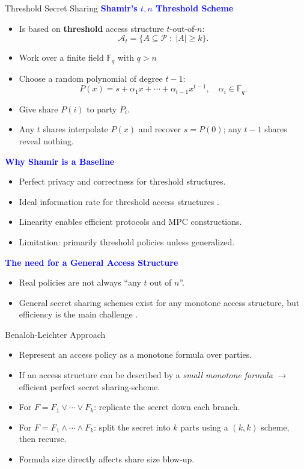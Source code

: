 \begin{frame}[allowframebreaks]{Threshold Secret Sharing}
	\textbf{\textcolor{blue}{Shamir's \(t, n\) Threshold Scheme}}
	\begin{itemize}
		\item Is based on \textbf{threshold} access structure \(t\)-out-of-\(n\):
			\[
			\mathcal{A}_t = \{A\subseteq \mathcal{P}\;:\;|A|\ge k\}.
			\]
		\item Work over a finite field \(\mathbb{F}_q\) with \(q>n\)
		\item Choose a random polynomial of degree \(t-1\):
		\[
		P(x) = s + \alpha_1x + \cdots + \alpha_{t-1}x^{t-1},
		\quad \alpha_i \in \mathbb{F}_q.
		\]
		\item Give share \(P(i)\) to party \(P_i\).
		\item Any \(t\) shares interpolate \(P(x)\) and recover \(s=P(0)\); any \(t-1\) shares reveal nothing.
	\end{itemize}
	
	\textbf{\textcolor{blue}{Why Shamir is a Baseline}}
	\begin{itemize}
		\item Perfect privacy and correctness for threshold structures.
		\item Ideal information rate for threshold access structures \cite{brickell1989some}.
		\item Linearity enables efficient protocols and MPC constructions.
		\item Limitation: primarily threshold policies unless generalized.
	\end{itemize}
	
	\textbf{\textcolor{blue}{The need for a General Access Structure}}
	\begin{itemize}
		\item Real policies are not always “any \(t\) out of \(n\)”.
		\item General secret sharing schemes exist for any monotone access structure, but efficiency is the main challenge \cite{beimel2011secret}.
	\end{itemize}
\end{frame}

\begin{frame}{Benaloh-Leichter Approach}
	\begin{itemize}
		\item Represent an access policy as a monotone formula over parties.
		\item If an access structure can be described by a \textit{small monotone formula} \(\rightarrow\) efficient perfect secret sharing-scheme.
		\item For \(F = F_1 \vee \cdots \vee F_k\): replicate the secret down each branch.
		\item For \(F = F_1 \wedge \cdots \wedge F_k\): split the secret into \(k\) parts using a \((k,k)\) scheme, then recurse.
		\item Formula size directly affects share size blow-up.
	\end{itemize}
\end{frame}


